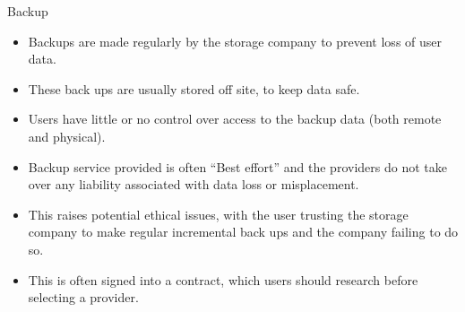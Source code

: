 \documentclass[final]{beamer}
\newlength{\onecolwid}
\newlength{\twocolwid}
\begin{document}
\begin{frame}[t]
\begin{columns}[t]
\begin{column}{\twocolwid}
\begin{columns}[t,totalwidth=\twocolwid]
\begin{column}{\onecolwid}

\end{column} %

\end{columns} %




\begin{columns}[t,totalwidth=\twocolwid] %

\begin{column}{\onecolwid} %


\begin{block}{Backup}
\begin{itemize}
\item Backups are made regularly by the storage company to prevent loss of user data.
\item These back ups are usually stored off site, to keep data safe. 
\item Users have little or no control over access to the backup data (both remote and physical).
\item Backup service provided is often ``Best effort'' and the providers do not take over any liability associated with data loss or misplacement.
\item This raises potential ethical issues, with the user trusting the storage company to make regular incremental back ups and the company failing to do so.
\item This is often signed into a contract, which users should research before selecting a provider.
\end{itemize}
\end{block}



\end{column}
\end{columns}
\end{column}
\end{columns}
\end{frame}
\end{document}
